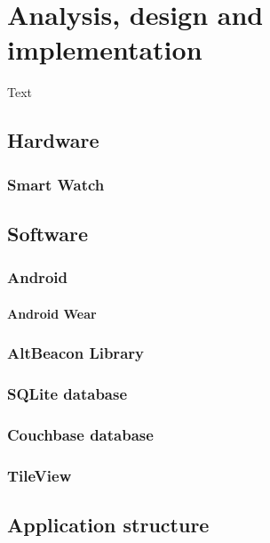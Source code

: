 \chapter{Analysis, design and implementation}\label{sec:AnalysisDesignAndImplementation}
Text

\section{Hardware}
\label{sec:Hardware}

\subsection{Smart Watch}
\label{subsec:SmartWatch}

\section{Software}
\label{sec:Software}

\subsection{Android}
\label{subsec:Android}

\subsubsection{Android Wear}
\label{subsec:AndroidWear}

\subsection{AltBeacon Library}
\label{subsec:AltBeaconLibrary}

\subsection{SQLite database}
\label{subsec:SQLiteDatabase}

\subsection{Couchbase database}
\label{subsec:CouchbaseDatabase}

\subsection{TileView}
\label{subsec:TileView}

\section{Application structure}
\label{sec:ApplicationStructure}

